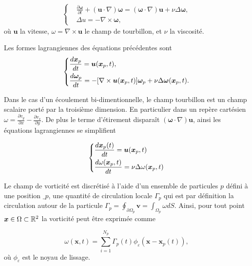 \begin{gather*}
    \left\{\begin{aligned}
         & \frac{\partial \bm \omega}{\partial t} + (\bm{u} \cdot \nabla) \bm \omega  =  (\bm \omega \cdot \nabla) \bm u + \nu \Delta \bm \omega, \\
         & \Delta u   =  -\nabla \times \bm \omega,
    \end{aligned} \right.
\end{gather*}où $\bm{u}$ la vitesse, $\omega= \nabla \times \bm u$ le champ de tourbillon, et $\nu$ la viscosité.

Les formes lagrangiennes des équations précédentes sont
\begin{gather*}
    \left\{\begin{aligned}
         & \frac{d \bm{x}_p}{dt} = \bm u(\bm{x}_p, t),                                                                        \\
         & \frac{d\bm \omega_p}{dt} = - [\nabla \times \bm u (\bm{x}_p, t)]\bm \omega_p + \nu \Delta \bm \omega(\bm{x}_p, t).
    \end{aligned} \right.
\end{gather*}

Dans le cas d'un écoulement bi-dimentionnelle, le champ tourbillon est un champ scalaire porté par la troisième dimension. En particulier dans un repère cartésien $\omega = \frac{\partial v_y}{\partial x} - \frac{\partial v_x}{\partial y}$. De plus le terme d'étirement disparaît $(\bm \omega \cdot \nabla) \bm u$, ainsi les équations lagrangiennes se simplifient

\begin{gather*}
    \left\{\begin{aligned}
         & \frac{d \bm{x}_p(t)}{dt} = \bm u(\bm{x}_p, t)                    \\
         & \frac{d\omega(\bm{x}_p, t)}{dt} = \nu \Delta \omega(\bm{x}_p, t)
    \end{aligned} \right.
\end{gather*}

Le champ de vorticité est discrétisé à l'aide d'un ensemble de particules $p$ défini à une position $\bm _p$, une quantité de circulation locale $\Gamma_p$ qui est par définition la circulation autour de la particule $\Gamma_p = \oint_{\partial \Omega_p} \bm v = \int_{\Omega_p} \omega dS$. Ainsi, pour tout point $\bm{x} \in \Omega \subset \mathbb R^2$ la vorticité peut être exprimée comme

\begin{equation*}
    \omega(\bm x, t) = \sum_{i=1}^{N_p} \Gamma_p(t) \phi_\varepsilon(\bm x - \bm x_p(t)),
\end{equation*}où $\phi_\varepsilon$ est le noyau de lissage.

